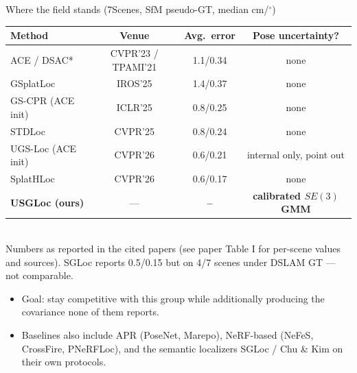 \documentclass[aspectratio=169,10pt]{beamer}
\newcommand{\method}{USGLoc}
\newcommand{\res}{{\color{red}\textbf{--}}}
\newcommand{\srcnote}[1]{{\tiny\color{ink!55}#1}}
\newcommand{\good}[1]{{\color{uLow}#1}}
\newcommand{\bad}[1]{{\color{uHigh}#1}}
\begin{document}
\begin{frame}{Where the field stands (7Scenes, SfM pseudo-GT, median cm/$^\circ$)}
  \centering
  \begin{tabular}{lccc}
    \toprule
    Method & Venue & Avg.\ error & Pose uncertainty?\\
    \midrule
    ACE / DSAC*        & CVPR'23 / TPAMI'21 & 1.1/0.34 & \bad{none}\\
    GSplatLoc          & IROS'25  & 1.4/0.37 & \bad{none}\\
    GS-CPR (ACE init)  & ICLR'25  & 0.8/0.25 & \bad{none}\\
    STDLoc             & CVPR'25  & 0.8/0.24 & \bad{none}\\
    UGS-Loc (ACE init) & CVPR'26  & 0.6/0.21 & \bad{internal only, point out}\\
    SplatHLoc          & CVPR'26  & 0.6/0.17 & \bad{none}\\
    \textbf{\method{} (ours)} & --- & \res & \good{\textbf{calibrated $SE(3)$ GMM}}\\
    \bottomrule
  \end{tabular}
  \vspace{2mm}\\
  \srcnote{Numbers as reported in the cited papers (see paper Table I for
  per-scene values and sources). SGLoc reports 0.5/0.15 but on 4/7 scenes
  under DSLAM GT --- not comparable.}
  \vspace{2mm}
  \begin{itemize}
    \item Goal: stay competitive with this group while \alert{additionally}
          producing the covariance none of them reports.
    \item Baselines also include APR (PoseNet, Marepo), NeRF-based
          (NeFeS, CrossFire, PNeRFLoc), and the semantic localizers
          SGLoc / Chu \& Kim on their own protocols.
  \end{itemize}
\end{frame}
\end{document}
